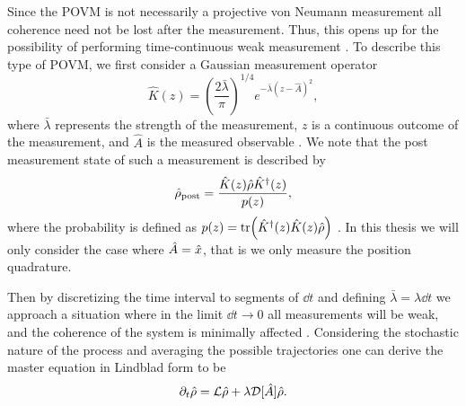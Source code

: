 Since the POVM is not necessarily a projective von Neumann measurement all coherence need not be lost after the measurement. Thus, this opens up for the possibility of performing time-continuous weak measurement \cite{Annby-Andersson:2024}. To describe this type of POVM, we first consider a Gaussian measurement operator
\begin{equation}
    \hat{K}(z) = \left(\frac{2 \bar{\lambda}}{\pi}\right)^{1/4} e^{-\bar{\lambda}(z - \hat{A})^2},
\end{equation}
where $\bar{\lambda}$ represents the strength of the measurement, $z$ is a continuous outcome of the measurement, and $\hat{A}$ is the measured observable \cite{Annby-Andersson:2024}. We note that the post measurement state of such a measurement is described by
\begin{equation}
    \hat{\rho}_\mathrm{post} =  \frac{\hat{K}(z) \hat{\rho} \hat{K}^\dagger(z)}{p(z)},
\end{equation}
where the probability is defined as $p(z) = \tr( \hat{K}^\dagger(z) \hat{K}(z) \hat{\rho} )$ \cite{Annby-Andersson:2024}. In this thesis we will only consider the case where $\hat{A} = \hat{x}$, that is we only measure the position quadrature.

Then by discretizing the time interval to segments of $\dd t$ and defining $\bar{\lambda} = \lambda \dd t$ we approach a situation where in the limit $\dd t \to 0$ all measurements will be weak, and the coherence of the system is minimally affected \cite{Annby-Andersson:2024}. Considering the stochastic nature of the process and averaging the possible trajectories one can derive the master equation \cite{Annby-Andersson:2024} in Lindblad form to be 
\begin{equation}
    \partial_t\hat{\rho} = \mathcal{L}\hat{\rho} + \lambda \mathcal{D}[\hat{A}] \hat{\rho}. \label{eq:masterMeas}
\end{equation}

